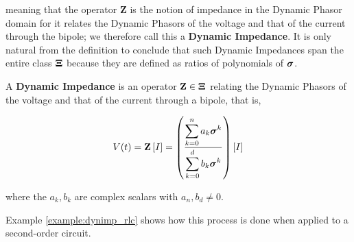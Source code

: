         \noindent meaning that the operator $\mathbf{Z}$ is the notion of impedance in the Dynamic Phasor domain for it relates the Dynamic Phasors of the voltage and that of the current through the bipole; we therefore call this a \textbf{Dynamic Impedance}. It is only natural from the definition to conclude that such Dynamic Impedances span the entire class $\boldsymbol{\Xi}$ because they are defined as ratios of polynomials of $\boldsymbol{\sigma}$.

\begin{definition}\label{def:steinmetz_impedance} A \textbf{Dynamic Impedance} is an operator $\mathbf{Z}\in\boldsymbol{\Xi}$ relating the Dynamic Phasors of the voltage and that of the current through a bipole, that is,

\begin{equation} V(t) = \mathbf{Z} \left[I\right] = \left(\dfrac{\displaystyle\sum_{k=0}^{n} a_k \boldsymbol{\sigma}^k}{\displaystyle\sum_{k=0}^{d} b_k \boldsymbol{\sigma}^k}\right) \left[I\right] \label{eq:def_impedance}\end{equation}

	\noindent where the $a_k,b_k$ are complex scalars with $a_n,b_d\neq 0$.

\end{definition}

	Example \ref{example:dynimp_rlc} shows how this process is done when applied to a second-order circuit.

